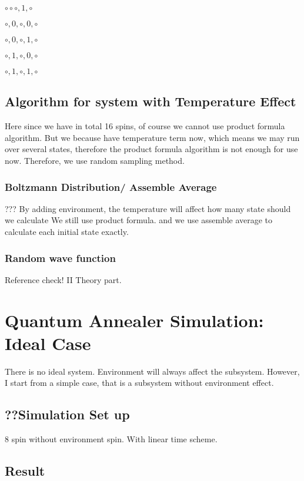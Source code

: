 \documentclass[twoside,a4paper,article]{combine}
\begin{document}
$\circ \circ \circ ,1, \circ$

$\circ ,0, \circ ,0, \circ$

$\circ ,0, \circ ,1, \circ$

$\circ ,1, \circ ,0, \circ$

$\circ ,1, \circ ,1, \circ$

\subsection{Algorithm for system with Temperature Effect}
Here since we have in total 16 spins, of course we cannot use product formula algorithm. But we because have temperature term now, which means we may run over several states, therefore the product formula algorithm is not enough for use now. Therefore, we use random sampling method.
\subsubsection{Boltzmann Distribution/ Assemble Average}
???	By adding environment, the temperature will affect how many state should we calculate
We still use product formula. and we use assemble average to calculate each initial state exactly.
\subsubsection{Random wave function}
Reference check! II Theory part.
\cite{Hams2000} 





\section{Quantum Annealer Simulation: Ideal Case}
	There is no ideal system. Environment will always affect the subsystem. However, I start from a simple case, that is a subsystem without environment effect. 
\subsection{??Simulation Set up}
	8 spin without environment spin. With linear time scheme. 

\subsection{Result}
\end{document}
